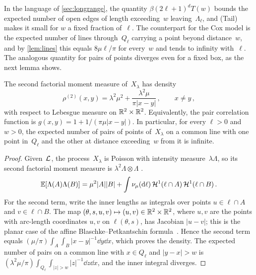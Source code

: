 \documentclass[11pt,letterpaper]{article}
\begin{document}
In the language of \cref{sec:longrange}, the quantity $\beta(2\ell+1)^dT(w)$ bounds the expected number of open edges of length exceeding~$w$ leaving~$\Lambda_\ell$, and (Tail) makes it small for $w$ a fixed fraction of~$\ell$. The counterpart for the Cox model is the expected number of lines through~$Q_\ell$ carrying a point beyond distance~$w$, and by \cref{lem:lines} this equals $8\mu\ell/\pi$ for every~$w$ and tends to infinity with~$\ell$. The analogous quantity for pairs of points diverges even for a fixed box, as the next lemma shows.

\begin{lemma}
\label{lem:paircorr}
The second factorial moment measure of~$X_\lambda$ has density
\begin{equation*}
  \rho^{(2)}(x,y)=\lambda^2\mu^2+\frac{\lambda^2\mu}{\pi\lvert x-y\rvert}\,,\qquad x\ne y\,,
\end{equation*}
with respect to Lebesgue measure on $\mathbb R^2\times\mathbb R^2$. Equivalently, the pair correlation function is $g(x,y)=1+1/(\pi\mu\lvert x-y\rvert)$. In particular, for every $\ell>0$ and $w>0$, the expected number of pairs of points of~$X_\lambda$ on a common line with one point in~$Q_\ell$ and the other at distance exceeding~$w$ from it is infinite.
\end{lemma}

\begin{proof}
Given~$\mathcal L$, the process~$X_\lambda$ is Poisson with intensity measure~$\lambda\Lambda$, so its second factorial moment measure is $\lambda^2\Lambda\otimes\Lambda$ \cite[Corollary~4.10]{LP17}.
\begin{equation*}
  \mathbb E[\Lambda(A)\Lambda(B)]=\mu^2\lvert A\rvert\lvert B\rvert+\int\nu_\mu(\mathrm{d}\ell)\,\mathcal H^1(\ell\cap A)\,\mathcal H^1(\ell\cap B)\,.
\end{equation*}
For the second term, write the inner lengths as integrals over points $u\in\ell\cap A$ and $v\in\ell\cap B$. The map $(\theta,s,u,v)\mapsto(u,v)\in\mathbb R^2\times\mathbb R^2$, where $u,v$ are the points with arc-length coordinates $u,v$ on $\ell(\theta,s)$, has Jacobian $\lvert u-v\rvert$; this is the planar case of the affine Blaschke--Petkantschin formula~\cite[Theorem~7.2.7]{SW08}. Hence the second term equals $(\mu/\pi)\int_A\int_B\lvert x-y\rvert^{-1}\dd y\dd x$, which proves the density. The expected number of pairs on a common line with $x\in Q_\ell$ and $\lvert y-x\rvert>w$ is $(\lambda^2\mu/\pi)\int_{Q_\ell}\int_{\lvert z\rvert>w}\lvert z\rvert^{-1}\dd z\dd x$, and the inner integral diverges.
\end{proof}
\end{document}
